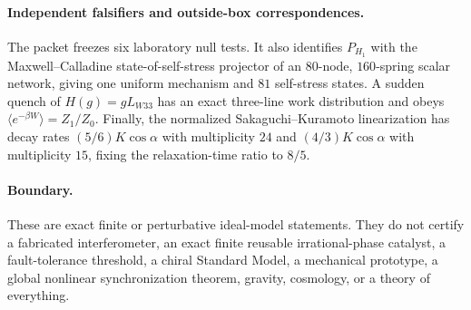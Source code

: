 \paragraph{Independent falsifiers and outside-box correspondences.}
The packet freezes six laboratory null tests.  It also identifies
$P_{H_1}$ with the Maxwell--Calladine state-of-self-stress projector of
an $80$-node, $160$-spring scalar network, giving one uniform mechanism
and $81$ self-stress states.  A sudden quench of $H(g)=gL_{W33}$ has an
exact three-line work distribution and obeys
$\langle e^{-\beta W}\rangle=Z_1/Z_0$.  Finally, the normalized
Sakaguchi--Kuramoto linearization has decay rates
$(5/6)K\cos\alpha$ with multiplicity $24$ and
$(4/3)K\cos\alpha$ with multiplicity $15$, fixing the relaxation-time
ratio to $8/5$.

\paragraph{Boundary.}
These are exact finite or perturbative ideal-model statements.  They do
not certify a fabricated interferometer, an exact finite reusable
irrational-phase catalyst, a fault-tolerance threshold, a chiral
Standard Model, a mechanical prototype, a global nonlinear
synchronization theorem, gravity, cosmology, or a theory of everything.

